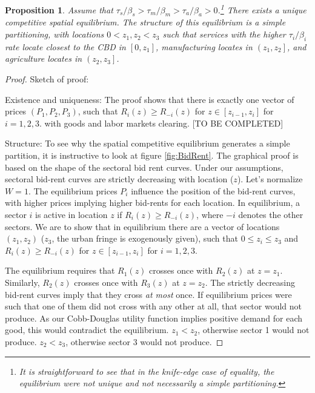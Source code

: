 \documentclass[12pt]{article}
\newtheorem{proposition}{Proposition}
\begin{document}
\begin{proposition}
Assume that $\tau_s/\beta_s>\tau_m/\beta_m>\tau_a/\beta_a>0$.\footnote{It is straightforward to see that in the knife-edge case of equality, the equilibrium were not unique and not necessarily a simple partitioning.} There exists a unique competitive spatial equilibrium. The structure of this equilibrium is a simple partitioning, with locations $0<z_1,z_2<z_3$ such that services with the higher $\tau_i/\beta_i$ rate locate closest to the CBD in $\left[0,z_1\right]$, manufacturing locates in $\left(z_1,z_2\right]$, and agriculture locates in $\left(z_2,z_3\right]$.
\end{proposition}
\begin{proof}
Sketch of proof:

Existence and uniqueness: The proof shows that there is exactly one vector of prices $(P_1, P_2, P_3)$, such that $R_i(z)\geq R_{-i}(z)$ for $z\in[z_{i-1},z_i]$ for $i=1,2,3.$ with goods and labor markets clearing. [TO BE COMPLETED]

Structure: To see why the spatial competitive equilibrium generates a simple partition, it is instructive to look at figure \ref{fig:BidRent}. The graphical proof is based on the shape of the sectoral bid rent curves.  Under our assumptions, sectoral bid-rent curves are strictly decreasing with location ($z$). Let's normalize $W=1$. The equilibrium prices $P_i$ influence the position of the bid-rent curves, with higher prices implying higher bid-rents for each location. In equilibrium, a sector $i$ is active in location $z$ if $R_i(z)\geq R_{-i}(z)$, where $-i$ denotes the other sectors. We are to show that in equilibrium there are a vector of locations $(z_1, z_2)$ ($z_3$, the urban fringe is exogenously given), such that $0\leq z_i\leq z_3$ and $R_i(z)\geq R_{-i}(z)$ for $z\in[z_{i-1},z_i]$ for $i=1,2,3.$

The equilibrium requires that $R_1(z)$ crosses once with $R_2(z)$ at $z=z_1$. Similarly, $R_2(z)$ crosses once with $R_3(z)$ at $z=z_2$. The strictly decreasing bid-rent curves imply that they cross \emph{at most} once. If equilibrium prices were such that one of them did not cross with any other at all, that sector would not produce. As our Cobb-Douglas utility function implies positive demand for each good, this would contradict the equilibrium. $z_1<z_2$, otherwise sector 1 would not produce. $z_2<z_3$, otherwise sector 3 would not produce.
\end{proof}
\end{document}
